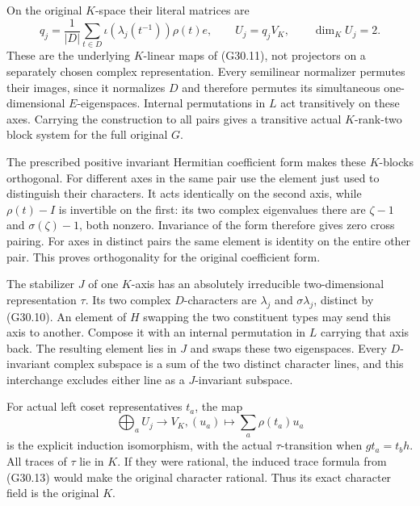 On the original \(K\)-space their literal matrices are
\[
 q_j=\frac1{|D|}\sum_{t\in D}
           \iota(\lambda_j(t^{-1}))\rho(t)e,
 \qquad U_j=q_jV_K,\qquad\dim_KU_j=2.                    \tag{G30.12}
\]
These are the underlying \(K\)-linear maps of (G30.11),
not projectors on a separately chosen complex representation.
Every semilinear normalizer permutes their images, since it
normalizes \(D\) and therefore permutes its simultaneous
one-dimensional \(E\)-eigenspaces. Internal permutations
in \(L\) act transitively on these axes. Carrying the
construction to all pairs gives a transitive actual
\(K\)-rank-two block system for the full original \(G\).

The prescribed positive invariant Hermitian coefficient form
makes these \(K\)-blocks orthogonal. For different axes
in the same pair use the element just used to distinguish
their characters. It acts identically on the second axis,
while \(\rho(t)-I\) is invertible on the first: its two
complex eigenvalues there are \(\zeta-1\) and
\(\sigma(\zeta)-1\), both nonzero. Invariance of the
form therefore gives zero cross pairing. For axes in distinct
pairs the same element is identity on the entire other pair.
This proves orthogonality for the original coefficient form.

The stabilizer \(J\) of one \(K\)-axis has an absolutely
irreducible two-dimensional representation \(\tau\).
Its two complex \(D\)-characters are \(\lambda_j\)
and \(\sigma\lambda_j\), distinct by (G30.10).
An element of \(H\) swapping the two constituent types
may send this axis to another. Compose it with an internal
permutation in \(L\) carrying that axis back. The resulting
element lies in \(J\) and swaps these two eigenspaces.
Every \(D\)-invariant complex subspace is a sum of the
two distinct character lines, and this interchange excludes
either line as a \(J\)-invariant subspace.

For actual left coset representatives \(t_a\), the map
\[
       \bigoplus_a U_j\longrightarrow V_K,
                     (u_a)\longmapsto\sum_a\rho(t_a)u_a
                                                               \tag{G30.13}
\]
is the explicit induction isomorphism, with the actual
\(\tau\)-transition when \(gt_a=t_bh\).
All traces of \(\tau\) lie in \(K\). If they were
rational, the induced trace formula from (G30.13) would
make the original character rational. Thus its exact
character field is the original \(K\).

